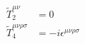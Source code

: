 \documentclass[a4paper]{article}
\newcommand{\pclosed}[1]{\left(#1\right)}
\newcommand{\cclosed}[1]{\left\{#1\right\}}
\newcommand{\trace}[1]{\operatorname{Tr}\cclosed{#1}}
\begin{document}
\begin{multicols}{3}
\begin{align*}
                \tilde{T}_2^{\mu\nu}                     & = 0                                                                                                                         \\
                \tilde{T}_4^{\mu\nu\rho\sigma}           & = -i\epsilon^{\mu\nu\rho\sigma}
            \end{align*}


\end{multicols}
\end{document}
